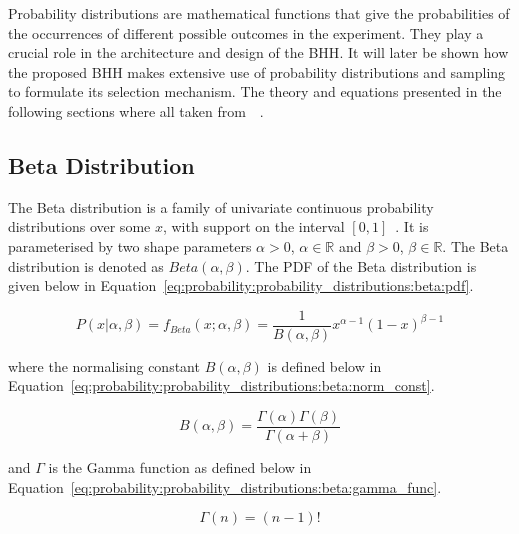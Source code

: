 Probability distributions are mathematical functions that give the probabilities of the occurrences of different possible outcomes in the experiment. They play a crucial role in the architecture and design of the \ac{BHH}. It will later be shown how the proposed \ac{BHH} makes extensive use of probability distributions and sampling to formulate its selection mechanism. The theory and equations presented in the following sections where all taken from~\citeauthor{ref:wackerly:2014}~\cite{ref:wackerly:2014}.


\subsection{Beta Distribution}
\label{sec:probability:probability_distributions:beta}

The Beta distribution is a family of univariate continuous probability distributions over some $x$, with support on the interval $[0,1]$~\cite{ref:wackerly:2014}. It is parameterised by two shape parameters $\alpha > 0$, $\alpha \in \mathbb{R}$ and $\beta > 0$, $\beta \in \mathbb{R}$. The Beta distribution is denoted as $Beta(\alpha, \beta)$. The \ac{PDF} of the Beta distribution is given below in Equation~\eqref{eq:probability:probability_distributions:beta:pdf}.

\begin{equation}
      \label{eq:probability:probability_distributions:beta:pdf}
      P(x \vert \alpha, \beta) = f_{Beta}(x; \alpha, \beta) = \frac{1}{B(\alpha, \beta)} x^{\alpha - 1} (1 - x)^{\beta - 1}
\end{equation}

where the normalising constant $B(\alpha, \beta)$ is defined below in Equation~\eqref{eq:probability:probability_distributions:beta:norm_const}.

\begin{equation}
      \label{eq:probability:probability_distributions:beta:norm_const}
      B(\alpha, \beta) = \frac{\Gamma(\alpha)\Gamma(\beta)}{\Gamma(\alpha + \beta)}
\end{equation}

and $\Gamma$ is the Gamma function as defined below in Equation~\eqref{eq:probability:probability_distributions:beta:gamma_func}.

\begin{equation}
      \label{eq:probability:probability_distributions:beta:gamma_func}
      \Gamma(n) = ( n - 1)!
\end{equation}

